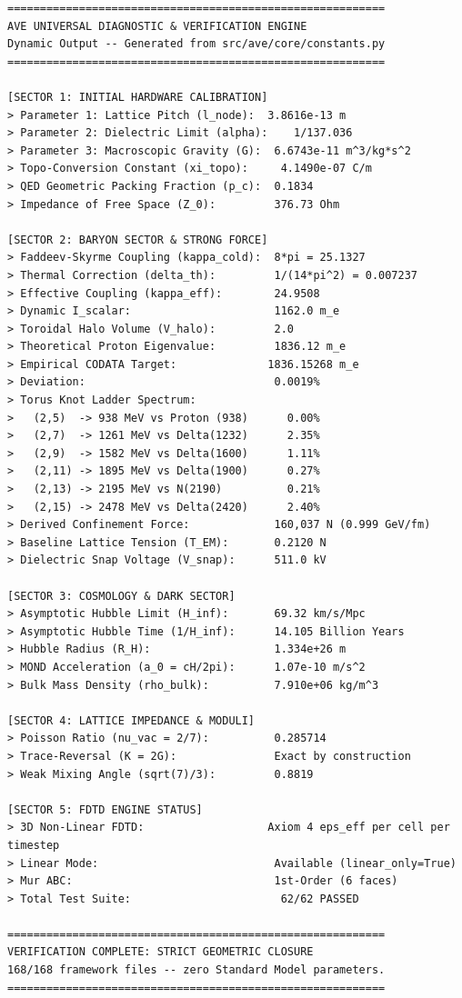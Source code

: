 \begin{verbatim}
==========================================================
AVE UNIVERSAL DIAGNOSTIC & VERIFICATION ENGINE
Dynamic Output -- Generated from src/ave/core/constants.py
==========================================================

[SECTOR 1: INITIAL HARDWARE CALIBRATION]
> Parameter 1: Lattice Pitch (l_node):  3.8616e-13 m
> Parameter 2: Dielectric Limit (alpha):    1/137.036
> Parameter 3: Macroscopic Gravity (G):  6.6743e-11 m^3/kg*s^2
> Topo-Conversion Constant (xi_topo):     4.1490e-07 C/m
> QED Geometric Packing Fraction (p_c):  0.1834
> Impedance of Free Space (Z_0):         376.73 Ohm

[SECTOR 2: BARYON SECTOR & STRONG FORCE]
> Faddeev-Skyrme Coupling (kappa_cold):  8*pi = 25.1327
> Thermal Correction (delta_th):         1/(14*pi^2) = 0.007237
> Effective Coupling (kappa_eff):        24.9508
> Dynamic I_scalar:                      1162.0 m_e
> Toroidal Halo Volume (V_halo):         2.0
> Theoretical Proton Eigenvalue:         1836.12 m_e
> Empirical CODATA Target:              1836.15268 m_e
> Deviation:                             0.0019%
> Torus Knot Ladder Spectrum:
>   (2,5)  -> 938 MeV vs Proton (938)      0.00%
>   (2,7)  -> 1261 MeV vs Delta(1232)      2.35%
>   (2,9)  -> 1582 MeV vs Delta(1600)      1.11%
>   (2,11) -> 1895 MeV vs Delta(1900)      0.27%
>   (2,13) -> 2195 MeV vs N(2190)          0.21%
>   (2,15) -> 2478 MeV vs Delta(2420)      2.40%
> Derived Confinement Force:             160,037 N (0.999 GeV/fm)
> Baseline Lattice Tension (T_EM):       0.2120 N
> Dielectric Snap Voltage (V_snap):      511.0 kV

[SECTOR 3: COSMOLOGY & DARK SECTOR]
> Asymptotic Hubble Limit (H_inf):       69.32 km/s/Mpc
> Asymptotic Hubble Time (1/H_inf):      14.105 Billion Years
> Hubble Radius (R_H):                   1.334e+26 m
> MOND Acceleration (a_0 = cH/2pi):      1.07e-10 m/s^2
> Bulk Mass Density (rho_bulk):          7.910e+06 kg/m^3

[SECTOR 4: LATTICE IMPEDANCE & MODULI]
> Poisson Ratio (nu_vac = 2/7):          0.285714
> Trace-Reversal (K = 2G):               Exact by construction
> Weak Mixing Angle (sqrt(7)/3):         0.8819

[SECTOR 5: FDTD ENGINE STATUS]
> 3D Non-Linear FDTD:                   Axiom 4 eps_eff per cell per timestep
> Linear Mode:                           Available (linear_only=True)
> Mur ABC:                               1st-Order (6 faces)
> Total Test Suite:                       62/62 PASSED

==========================================================
VERIFICATION COMPLETE: STRICT GEOMETRIC CLOSURE
168/168 framework files -- zero Standard Model parameters.
==========================================================
\end{verbatim}

